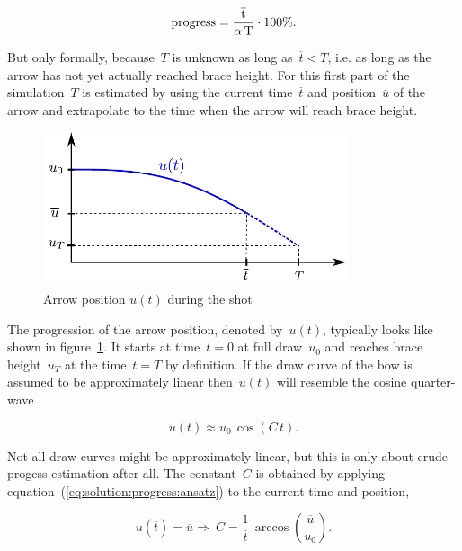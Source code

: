 \begin{equation}
\rm{progress} = \frac{\overline{t}}{\alpha\,T}\cdot 100\%.\label{eq:solution:progress}
\end{equation}

But only formally, because~$T$ is unknown as long as~$\overline{t} < T$, i.e. as long as the arrow has not yet actually reached brace height. For this first part of the simulation~$T$ is estimated by using the current time~$\overline{t}$ and position~$\overline{u}$ of the arrow and extrapolate to the time when the arrow will reach brace height.

\begin{figure}[h]
\centering
\includegraphics[width=0.8\textwidth]{figures/solution/dynamic_progress}
\caption{Arrow position $u(t)$ during the shot}
\label{fig:solution:dynamic_progress}
\end{figure}

The progression of the arrow position, denoted by~$u(t)$, typically looks like shown in figure~\ref{fig:solution:dynamic_progress}.
It starts at time~$t = 0$ at full draw~$u_0$ and reaches brace height~$u_T$ at the time~$t = T$ by definition.
If the draw curve of the bow is assumed to be approximately linear then~$u(t)$ will resemble the cosine quarter-wave

\begin{equation}
u(t) \approx u_{0}\,\cos{\left(C\,t\right)}.\label{eq:solution:progress:ansatz}
\end{equation}

Not all draw curves might be approximately linear, but this is only about crude progess estimation after all.
The constant~$C$ is obtained by applying equation~(\ref{eq:solution:progress:ansatz}) to the current time and position,

\begin{equation}
u(\overline{t}) = \overline{u} \Rightarrow \ C = \frac{1}{\overline{t}}\,\arccos{\left(\frac{\overline{u}}{u_0}\right)}.\label{eq:solution:progress:constant}
\end{equation}

